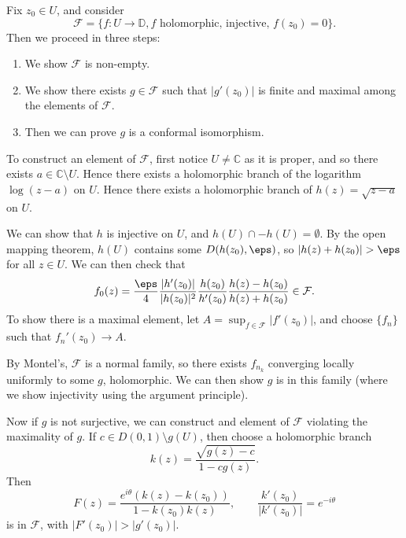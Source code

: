 \documentclass[12pt]{article}
\begin{document}
\begin{proofbox} 
	Fix $z_0 \in U$, and consider
	\[
		\mathcal{F} = \{f : U \to \mathbb{D}, f\text{ holomorphic, injective, } f(z_0) = 0\}.
	\]
	Then we proceed in three steps:
	\begin{enumerate}
		\item We show $\mathcal{F}$ is non-empty.
		\item We show there exists $g \in \mathcal{F}$ such that $|g'(z_0)|$ is finite and maximal among the elements of $\mathcal{F}$.
		\item Then we can prove $g$ is a conformal isomorphism.
	\end{enumerate}
	To construct an element of $\mathcal{F}$, first notice $U \neq \mathbb{C}$ as it is proper, and so there exists $a \in \mathbb{C} \setminus U$. Hence there exists a holomorphic branch of the logarithm $\log(z-a)$ on $U$. Hence there exists a holomorphic branch of $h(z) = \sqrt{z-a}$ on $U$.

	We can show that $h$ is injective on $U$, and $h(U) \cap -h(U) = \emptyset$. By the open mapping theorem, $h(U)$ contains some $D(h(z_0), \eps)$, so $|h(z) + h(z_0)| > \eps$ for all $z \in U$. We can then check that
	\[
	f_0(z) = \frac{\eps}{4} \frac{|h'(z_0)|}{|h(z_0)|^2} \frac{h(z_0)}{h'(z_0)} \frac{h(z) - h(z_0)}{h(z) + h(z_0)} \in \mathcal{F}.
	\]
	To show there is a maximal element, let $A = \sup_{f \in \mathcal{F}}|f'(z_0)|$, and choose $\{f_n\}$ such that $f_n'(z_0) \to A$.

	By Montel's, $\mathcal{F}$ is a normal family, so there exists $f_{n_k}$ converging locally uniformly to some $g$, holomorphic. We can then show $g$ is in this family (where we show injectivity using the argument principle).

	Now if $g$ is not surjective, we can construct and element of $\mathcal{F}$ violating the maximality of $g$. If $c \in D(0, 1) \setminus g(U)$, then choose a holomorphic branch
	\[
		k(z) = \frac{\sqrt{g(z) - c}}{1-cg(z)}.
	\]
	Then
	\[
	F(z) = \frac{e^{i\theta}(k(z)-k(z_0))}{1 - k(z_0)k(z)}, \qquad \frac{k'(z_0)}{|k'(z_0)|} = e^{-i\theta}
	\]
	is in $\mathcal{F}$, with $|F'(z_0)| > |g'(z_0)|$.
\end{proofbox}

\newpage

\printindex
\end{document}
